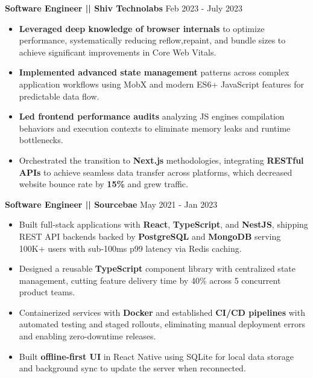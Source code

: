 \documentclass[a4paper]{article}
\begin{document}
\vspace{4pt}
\textbf{Software Engineer || Shiv Technolabs}
\hfill Feb 2023 - July 2023
\begin{itemize}
\vspace{1pt}

\item {\textbf{Leveraged deep knowledge of browser internals} to optimize performance, systematically reducing reflow,repaint, and bundle sizes to achieve significant improvements in Core Web Vitals.}
\item {\textbf{Implemented advanced state management} patterns across complex application workflows using MobX and modern ES6+ JavaScript features for predictable data flow.}
\item {\textbf{Led frontend performance audits} analyzing JS engines compilation behaviors and execution contexts to eliminate memory leaks and runtime bottlenecks.}
\item {Orchestrated the transition to \textbf{Next.js} methodologies, integrating \textbf{RESTful APIs} to achieve seamless data transfer across platforms, which decreased website bounce rate by \textbf{15\%} and grew traffic.}
\end{itemize}




\vspace{4pt}
\textbf{Software Engineer || Sourcebae}
\hfill May 2021 - Jan 2023
\begin{itemize}
\vspace{1pt}

\item {Built full-stack applications with \textbf{React}, \textbf{TypeScript}, and \textbf{NestJS}, shipping REST API backends backed by \textbf{PostgreSQL} and \textbf{MongoDB} serving 100K+ users with sub-100ms p99 latency via Redis caching.}
\item {Designed a reusable \textbf{TypeScript} component library with centralized state management, cutting feature delivery time by 40\% across 5 concurrent product teams.}
\item {Containerized services with \textbf{Docker} and established \textbf{CI/CD pipelines} with automated testing and staged rollouts, eliminating manual deployment errors and enabling zero-downtime releases.}
\item {Built \textbf{offline-first UI} in React Native using SQLite for local data storage and background sync to update the server when reconnected.}
\end{itemize}
\end{document}
